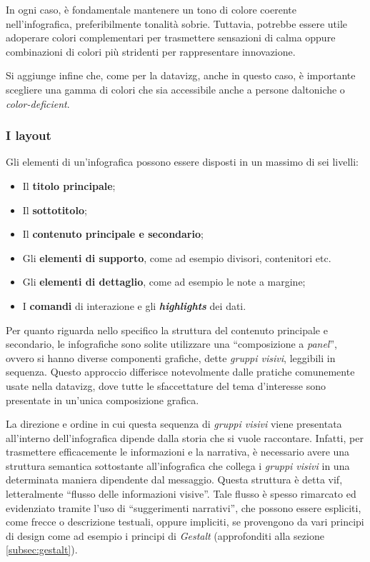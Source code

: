 \bigskip
\noindent In ogni caso, è fondamentale mantenere un tono di colore coerente nell'infografica, preferibilmente tonalità sobrie. Tuttavia, potrebbe essere utile adoperare colori 
complementari per trasmettere sensazioni di calma oppure combinazioni di colori più stridenti per rappresentare innovazione.

Si aggiunge infine che, come per la \gls{datavizg}, anche in questo caso, è importante scegliere una gamma di colori che sia accessibile anche a persone daltoniche o \emph{color-deficient}.

\subsubsection{I layout}\label{subsec:info_layout}
Gli elementi di un'infografica possono essere disposti in un massimo di sei livelli:
\begin{itemize}
    \item Il \textbf{titolo principale};
    \item Il \textbf{sottotitolo};
    \item Il \textbf{contenuto principale e secondario};
    \item Gli \textbf{elementi di supporto}, come ad esempio divisori, contenitori etc.
    \item Gli \textbf{elementi di dettaglio}, come ad esempio le note a margine;
    \item I \textbf{comandi} di interazione e gli \textbf{\emph{highlights}} dei dati.
\end{itemize}

\bigskip
\noindent Per quanto riguarda nello specifico la struttura del contenuto principale e secondario, le infografiche sono solite
utilizzare una ``composizione a \emph{panel}'', ovvero si hanno diverse componenti grafiche, dette \emph{gruppi visivi}, leggibili in sequenza.
Questo approccio differisce notevolmente dalle pratiche comunemente usate nella \gls{datavizg}, dove tutte le sfaccettature del tema d'interesse sono presentate 
in un'unica composizione grafica.

La direzione e ordine in cui questa sequenza di \emph{gruppi visivi} viene presentata all'interno dell'infografica dipende dalla 
storia che si vuole raccontare. Infatti, per trasmettere efficacemente le informazioni e la narrativa, è necessario avere una struttura semantica sottostante all'infografica
che collega i \emph{gruppi visivi} in una determinata maniera dipendente dal messaggio. Questa struttura è detta \gls{vif}, letteralmente ``flusso delle informazioni visive''.
Tale flusso è spesso rimarcato ed evidenziato tramite l'uso di ``suggerimenti narrativi'', che possono essere espliciti, come frecce o descrizione testuali, oppure impliciti, se 
provengono da vari principi di design come ad esempio i principi di \emph{Gestalt} (approfonditi alla sezione \ref{subsec:gestalt}).

